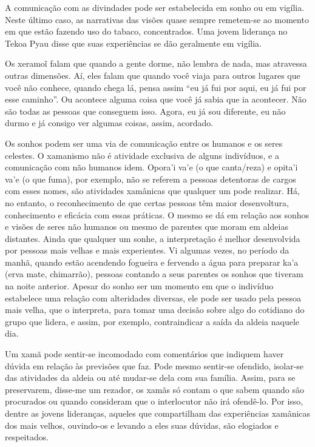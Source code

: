 A comunicação com as divindades pode ser estabelecida em sonho ou em
vigília. Neste último caso, as narrativas das visões quase sempre
remetem-se ao momento em que estão fazendo uso do tabaco, concentrados.
Uma jovem liderança no Tekoa Pyau disse que suas experiências se dão
geralmente em vigília.

Os xeramo\~{i} falam que quando a gente dorme, não
lembra de nada, mas atravessa outras dimensões. Aí, eles falam que
quando você viaja para outros lugares que você não conhece, quando
chega lá, pensa assim ``eu já fui por aqui, eu já fui por esse caminho''.
Ou acontece alguma coisa que você já sabia que ia acontecer. Não são
todas as pessoas que conseguem isso. Agora, eu já sou diferente, eu não
durmo e já consigo ver algumas coisas, assim, acordado.

Os sonhos podem ser uma via de comunicação entre os humanos e os seres
celestes. O xamanismo não é atividade exclusiva de alguns indivíduos, e
a comunicação com não humanos idem. Opora’i va’e (o que canta/reza) e
opita’i va’e (o que fuma), por exemplo, não se referem a pessoas
detentoras de cargos com esses nomes, são atividades xamânicas que
qualquer um pode realizar. Há, no entanto, o reconhecimento de que
certas pessoas têm maior desenvoltura, conhecimento e eficácia com
essas práticas. O mesmo se dá em relação aos sonhos e visões de seres
não humanos ou mesmo de parentes que moram em aldeias distantes. Ainda
que qualquer um sonhe, a interpretação é melhor desenvolvida por
pessoas mais velhas e mais experientes. Vi algumas vezes, no período da
manhã, quando estão acendendo fogueira e fervendo a água para preparar
ka’a (erva mate, chimarrão), pessoas contando a seus parentes os sonhos
que tiveram na noite anterior. Apesar do sonho ser um momento em que o
indivíduo estabelece uma relação com alteridades diversas, ele pode ser
usado pela pessoa mais velha, que o interpreta, para tomar uma decisão
sobre algo do cotidiano do grupo que lidera, e assim, por exemplo,
contraindicar a saída da aldeia naquele dia.

Um xamã pode sentir-se incomodado com comentários que indiquem haver
dúvida em relação às previsões que faz. Pode mesmo sentir-se ofendido,
isolar-se das atividades da aldeia ou até mudar-se dela com sua
família. Assim, para se preservarem, disse-me um rezador, os xamãs só
contam o que sabem quando são procurados ou quando consideram que o
interlocutor não irá ofendê-lo. Por isso, dentre as jovens lideranças,
aqueles que compartilham das experiências xamânicas dos mais velhos,
ouvindo-os e levando a eles suas dúvidas, são elogiados e respeitados.

